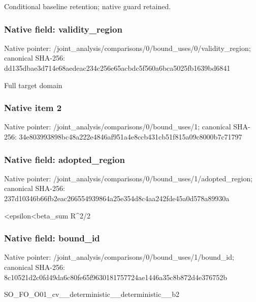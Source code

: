 \documentclass[10pt,a4paper]{article}
\begin{document}
\begingroup\raggedright\sloppy Conditional baseline retention;\allowbreak{} native guard retained.\par\endgroup

\subsubsection{Native field: validity\_\allowbreak{}region}
Native pointer: /joint\_\allowbreak{}analysis/comparisons/0/bound\_\allowbreak{}uses/0/validity\_\allowbreak{}region; canonical SHA-256: dd135dbae3d714e68aedeac234c256e65acbdc5f560a6bca5025fb1639bd6841

\begingroup\raggedright\sloppy Full target domain\par\endgroup

\subsubsection{Native item 2}
Native pointer: /joint\_\allowbreak{}analysis/comparisons/0/bound\_\allowbreak{}uses/1; canonical SHA-256: 34e803993898bc48a222e4846af951a4e8ccb431cb51f815a09c8000b7c71797

\subsubsection{Native field: adopted\_\allowbreak{}region}
Native pointer: /joint\_\allowbreak{}analysis/comparisons/0/bound\_\allowbreak{}uses/1/adopted\_\allowbreak{}region; canonical SHA-256: 237d10346b66fb2eac266554939864a25e354d8c4aa242fde45a0d578a89930a

\begingroup\raggedright{}<epsilon<beta\_\allowbreak{}sum R\textasciicircum{}2/\allowbreak{}2\par\endgroup

\subsubsection{Native field: bound\_\allowbreak{}id}
Native pointer: /joint\_\allowbreak{}analysis/comparisons/0/bound\_\allowbreak{}uses/1/bound\_\allowbreak{}id; canonical SHA-256: 8c10521d2c0fd49da6c80fe65f9630181757724ae1446a35c8b872d4e376752b

\begingroup\raggedright\sloppy SO\_\allowbreak{}FO\_\allowbreak{}O01\_\allowbreak{}cv\_\allowbreak{}\_\allowbreak{}deterministic\_\allowbreak{}\_\allowbreak{}deterministic\_\allowbreak{}\_\allowbreak{}b2\par\endgroup
\end{document}
